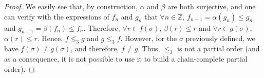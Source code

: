 \documentclass[a4paper,10pt]{llncs}
\def\ZZ {{\mathbb Z}}
\def\RRposi {{\mathbb R_{\geq 0}^{\infty}}}
\begin{document}
\begin{proof}
We easily see that, by construction, $\alpha$ and $\beta$ are both surjective, and one can verify with the expressions of $f_n$ and $g_n$ that $\forall n \in \ZZ$, $f_{n-1} = \alpha(g_n) \leq g_n$ and $g_{n-1} = \beta(f_n) \leq f_n$. Therefore, $\forall r \in f(\sigma)$, $\beta(r) \leq r$ and $\forall r \in g(\sigma)$, $\alpha(r) \leq r$.\newline
Hence, $f \leq_3 g$ and $g \leq_3 f$. However, for the $\sigma$ previously defined, we have $f(\sigma) \neq g(\sigma)$, and therefore, $f \neq g$.\newline
Thus, $\leq_3$ is not a partial order (and as a consequence, it is not possible to use it to build a chain-complete partial order).
\end{proof}


%
%
%
\end{document}
